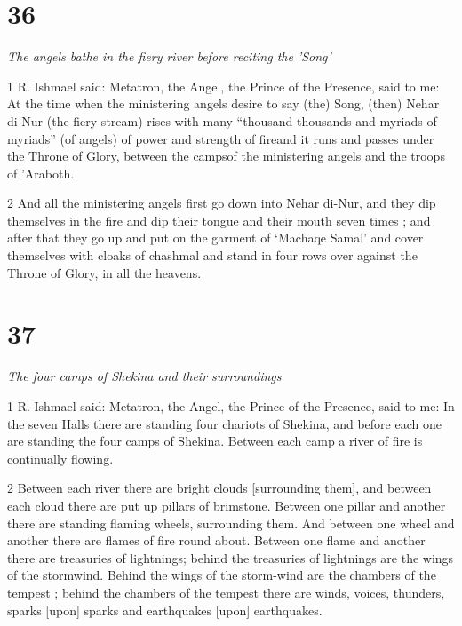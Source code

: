 \chapter{36}

\par \textit{The angels bathe in the fiery river before reciting the 'Song'}

\par 1 R. Ishmael said: Metatron, the Angel, the Prince of the Presence, said to me: At the time when the ministering angels desire to say (the) Song, (then) Nehar di-Nur (the fiery stream) rises with many “thousand thousands and myriads of myriads” (of angels) of power and strength of fireand it runs and passes under the Throne of Glory, between the campsof the ministering angels and the troops of 'Araboth. 

\par 2 And all the ministering angels first go down into Nehar di-Nur, and they dip themselves in the fire and dip their tongue and their mouth seven times ; and after that they go up and put on the garment of ‘Machaqe Samal’ and cover themselves with cloaks of chashmal and stand in four rows over against the Throne of Glory, in all the heavens. 


\chapter{37}

\par \textit{The four camps of Shekina and their surroundings}

\par 1 R. Ishmael said: Metatron, the Angel, the Prince of the Presence, said to me: In the seven Halls there are standing four chariots of Shekina, and before each one are standing the four camps of Shekina. Between each camp a river of fire is continually flowing. 

\par 2 Between each river there are bright clouds [surrounding them], and between each cloud there are put up pillars of brimstone. Between one pillar and another there are standing flaming wheels, surrounding them. And between one wheel and another there are flames of fire round about. Between one flame and another there are treasuries of lightnings; behind the treasuries of lightnings are the wings of the stormwind. Behind the wings of the storm-wind are the chambers of the tempest ; behind the chambers of the tempest there are winds, voices, thunders, sparks [upon] sparks and earthquakes [upon] earthquakes. 


